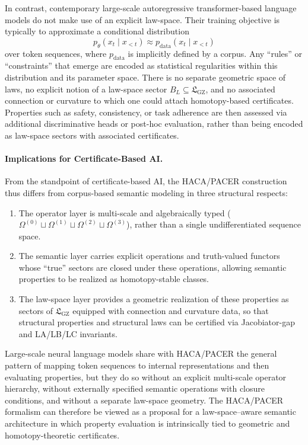 \documentclass[11pt]{book}
\theoremstyle{plain}
\theoremstyle{definition}
\theoremstyle{remark}
\newcommand{\GZLS}{\ensuremath{\mathfrak{L}_{\mathrm{GZ}}}}       \newcommand{\GZLT}{\ensuremath{M_{!w}}}                           \newcommand{\GZLOC}{\ensuremath{A_M}}                             \newcommand{\GZLC}{\ensuremath{\omega_{\mathrm{law}}}}            \newcommand{\GZLCurv}{\ensuremath{\mathcal{F}_{\mathrm{law}}}}
\begin{document}
In contrast, contemporary large-scale autoregressive transformer-based
language models do not make use of an explicit law-space. Their training
objective is typically to approximate a conditional distribution
\[
  p_\theta(x_t\mid x_{<t})
  \approx
  p_{\text{data}}(x_t\mid x_{<t})
\]
over token sequences, where $p_{\text{data}}$ is implicitly defined by a
corpus. Any ``rules'' or ``constraints'' that emerge are encoded as
statistical regularities within this distribution and its parameter
space. There is no separate geometric space of laws, no explicit notion
of a law-space sector $B_L\subseteq\GZLS$, and no associated connection
or curvature to which one could attach homotopy-based certificates.
Properties such as safety, consistency, or task adherence are then
assessed via additional discriminative heads or post-hoc evaluation,
rather than being encoded as law-space sectors with associated
certificates.



\paragraph{Implications for Certificate-Based AI.}

From the standpoint of certificate-based AI, the HACA/PACER construction
thus differs from corpus-based semantic modeling in three structural
respects:
\begin{enumerate}
  \item The operator layer is multi-scale and algebraically typed
        ($\Omega^{(0)}\sqcup\Omega^{(1)}\sqcup\Omega^{(2)}\sqcup\Omega^{(3)}$),
        rather than a single undifferentiated sequence space.
  \item The semantic layer carries explicit operations and
        truth-valued functors whose ``true'' sectors are closed under
        these operations, allowing semantic properties to be realized as
        homotopy-stable classes.
  \item The law-space layer provides a geometric realization of these
        properties as sectors of $\GZLS$ equipped with connection and
        curvature data, so that structural properties and structural laws
        can be certified via Jacobiator-gap and LA/LB/LC invariants.
\end{enumerate}
Large-scale neural language models share with HACA/PACER the general
pattern of mapping token sequences to internal representations and then
evaluating properties, but they do so without an explicit multi-scale
operator hierarchy, without externally specified semantic operations
with closure conditions, and without a separate law-space geometry. The
HACA/PACER formalism can therefore be viewed as a proposal for a
law-space–aware semantic architecture in which property evaluation is
intrinsically tied to geometric and homotopy-theoretic certificates.
\end{document}
